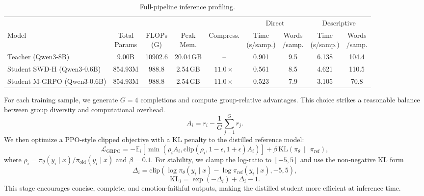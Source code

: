 \documentclass[sigconf]{acmart}
\begin{document}
\begin{table}[t]
    \centering
    \tiny
    \caption{Full-pipeline inference profiling.}
    \vspace{-1em}
    \fontsize{8.5}{8.5}\selectfont
    \renewcommand\tabcolsep{5pt}  
    \label{tab:inference-profile}
    \begin{tabular}{l c c c c cc cc}
    \toprule
    & & & & & \multicolumn{2}{c}{Direct} & \multicolumn{2}{c}{Descriptive} \\
    \cmidrule(lr){6-7} \cmidrule(lr){8-9}
    Model
      & \makecell{Total\\Params}
      & \makecell{FLOPs\\(G)}
      & \makecell{Peak\\Mem.}
      & Compress.
      & \makecell{Time\\(s/samp.)}
      & \makecell{Words\\/samp.}
      & \makecell{Time\\(s/samp.)}
      & \makecell{Words\\/samp.} \\
    \midrule
    Teacher (Qwen3-8B)         & 9.00B   & 10902.6 & 20.04\,GB & --           & 0.901 & 9.5   & 6.138 & 104.4 \\
    Student SWD-H (Qwen3-0.6B)   & 854.93M &   988.8 &  2.54\,GB & $11.0\times$ & 0.561 & 8.5   & 4.621 & 110.5 \\
     Student M-GRPO (Qwen3-0.6B)  & 854.93M &   988.8 &  2.54\,GB & $11.0\times$ & 0.523 & 7.9   & 3.105 & 70.8  \\
    \bottomrule
    \end{tabular}%
\end{table}


For each training sample, we generate $G=4$ completions and compute group-relative advantages. This choice strikes a reasonable balance between group diversity and computational overhead.
\begin{equation}
A_i = r_i - \frac{1}{G}\sum_{j=1}^{G} r_j.
\end{equation}
We then optimize a PPO-style clipped objective with a KL penalty to the distilled reference model:
\begin{equation}
\mathcal{L}_{\mathrm{GRPO}}
=
-\mathbb{E}_i
\left[
\min\!\left(
\rho_i A_i,
\mathrm{clip}(\rho_i,1-\epsilon,1+\epsilon)A_i
\right)
\right]
+
\beta\,\mathrm{KL}(\pi_{\theta}\,\|\,\pi_{\mathrm{ref}}),
\end{equation}
where $\rho_i=\pi_{\theta}(y_i\mid x)/\pi_{\mathrm{old}}(y_i\mid x)$ and $\beta=0.1$. For stability, we clamp the log-ratio to $[-5,5]$ and use the non-negative KL form
\begin{equation}
\Delta_i=
\mathrm{clip}\!\left(
\log \pi_{\theta}(y_i\mid x)-\log \pi_{\mathrm{ref}}(y_i\mid x), -5, 5
\right),
\end{equation}
\begin{equation}
\mathrm{KL}_i=\exp(-\Delta_i)+\Delta_i-1.
\end{equation}
This stage encourages concise, complete, and emotion-faithful outputs, making the distilled student more efficient at inference time.
\end{document}
